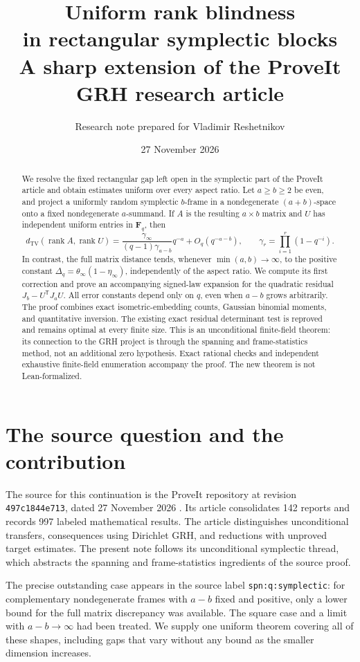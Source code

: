 \documentclass[11pt,letterpaper]{article}
\title{\textbf{Uniform rank blindness\\in rectangular symplectic blocks}\\[6pt]
\large A sharp extension of the ProveIt GRH research article}
\author{Research note prepared for Vladimir Reshetnikov}
\date{27 November 2026}
\theoremstyle{remark}
\newcommand{\F}{\mathbf F}
\newcommand{\TV}{d_{\mathrm{TV}}}
\newcommand{\rank}{\operatorname{rank}}
\begin{document}
\maketitle
\begin{abstract}
We resolve the fixed rectangular gap left open in the symplectic part of the
ProveIt article and obtain estimates uniform over every aspect ratio.
Let $a\ge b\ge2$ be even, and project a uniformly random symplectic $b$-frame
in a nondegenerate $(a+b)$-space onto a fixed nondegenerate $a$-summand.
If $A$ is the resulting $a\times b$ matrix and $U$ has independent uniform
entries in $\F_q$, then
\[
 \TV(\rank A,\rank U)
 =\frac{\gamma_\infty}{(q-1)\gamma_{a-b}}q^{-a}
   +O_q(q^{-a-b}),\qquad
 \gamma_r=\prod_{i=1}^r(1-q^{-i}).
\]
In contrast, the full matrix distance tends, whenever $\min(a,b)\to\infty$,
to the positive constant
$\Delta_q=\theta_\infty(1-\eta_\infty)$, independently of the aspect ratio.
We compute its first correction and prove an accompanying signed-law
expansion for the quadratic residual $J_b-U^{\mathsf T}J_aU$.
All error constants depend only on $q$, even when $a-b$ grows arbitrarily.
The proof combines exact isometric-embedding counts, Gaussian binomial
moments, and quantitative inversion. The existing exact residual determinant
test is reproved and remains optimal at every finite size.
This is an unconditional finite-field theorem: its connection to the GRH
project is through the spanning and frame-statistics method, not an additional
zero hypothesis. Exact rational checks and independent exhaustive finite-field
enumeration accompany the proof. The new theorem is not Lean-formalized.
\end{abstract}

\section{The source question and the contribution}

The source for this continuation is the ProveIt repository at revision
\texttt{497c1844e713}, dated 27 November 2026 \cite{ProveIt}.
Its article consolidates 142 reports and records 997 labeled mathematical
results. The article distinguishes unconditional transfers, consequences
using Dirichlet GRH, and reductions with unproved target estimates.
The present note follows its unconditional symplectic thread, which abstracts
the spanning and frame-statistics ingredients of the source proof.

The precise outstanding case appears in the source label
\texttt{spn:q:symplectic}: for complementary nondegenerate frames with
$a-b$ fixed and positive, only a lower bound for the full matrix discrepancy
was available. The square case and a limit with $a-b\to\infty$ had been treated.
We supply one uniform theorem covering all of these shapes, including gaps
that vary without any bound as the smaller dimension increases.
\end{document}

